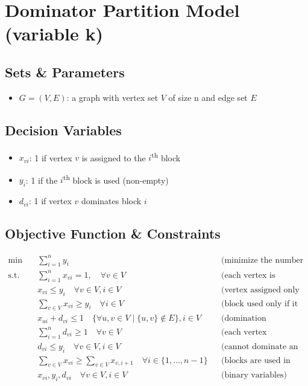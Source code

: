 \section{Dominator Partition Model (variable k)}
\label{sec:dominator_partition_variable_k}


\subsection*{Sets \& Parameters}
\begin{itemize}[label=, noitemsep]
    \item $G=(V,E)$: a graph with vertex set $V$ of size n and edge set $E$
\end{itemize}

\subsection*{Decision Variables}
\begin{itemize}[label=, noitemsep]
    \item $x_{vi}$: 1 if vertex $v$ is assigned to the $i$\textsuperscript{th} block
    \item $y_{i}$: 1 if the $i$\textsuperscript{th} block is used (non-empty)
    \item $d_{vi}$: 1 if vertex $v$ dominates block $i$
\end{itemize}

\subsection*{Objective Function \& Constraints}
\begin{align*}
    \min \quad &\sum_{i=1}^{n} y_i &&\text{(minimize the number of blocks used)}\\
    \text{s.t.} \quad
    &\sum_{i=1}^{n} x_{vi} = 1, \quad \forall v \in V &&\text{(each vertex is assigned to one block)}\\
    &x_{vi} \leq y_i \quad \forall v \in V, i \in V &&\text{(vertex assigned only if block used)}\\
    & \sum_{v \in V} x_{vi} \geq y_i \quad \forall i \in V &&\text{(block used only if it is not empty)}\\
    &x_{ui} + d_{vi} \leq 1 \quad \{\forall u, v \in V \mid \{u,v\} \notin E\}, i \in V &&\text{(domination condition)}\\
    &\sum_{i=1}^{n} d_{vi} \geq 1 \quad \forall v \in V &&\text{(each vertex dominates at least one block)}\\
    & d_{vi} \leq y_i \quad \forall v \in V, i \in V &&\text{(cannot dominate an empty block)}\\
    & \sum_{v \in V} x_{vi} \geq \sum_{v \in V} x_{v,i+1} \quad \forall i \in \{1, \dots, n-1\} &&\text{(blocks are used in order)}\\
    &x_{vi}, y_i, d_{vi} \quad \forall v \in V, i \in V &&\text{(binary variables)}\\
\end{align*}

